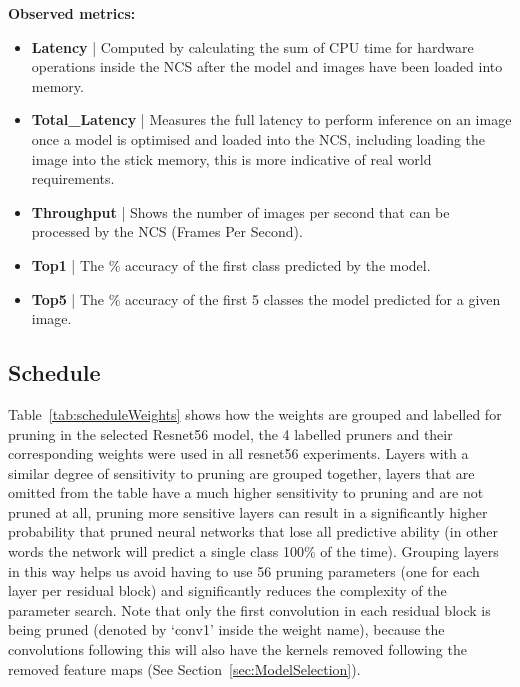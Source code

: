 \documentclass[../Dissertation.tex]{subfiles}
\begin{document}
\singlespacing
\noindent\textbf{Observed metrics:}
\begin{itemize}
    \item \textbf{Latency} | Computed by calculating the sum of CPU time for hardware operations inside the NCS after the model and images have been loaded into memory.
    \item \textbf{Total\_Latency} | Measures the full latency to perform inference on an image once a model is optimised and loaded into the NCS, including loading the image into the stick memory, this is more indicative of real world requirements.
    \item \textbf{Throughput} | Shows the number of images per second that can be processed by the NCS (Frames Per Second).
    \item \textbf{Top1} | The \% accuracy of the first class predicted by the model.
    \item \textbf{Top5} | The \% accuracy of the first 5 classes the model predicted for a given image.
\end{itemize}
\doublespacing

\newpage
\subsection{Schedule}
Table~\ref{tab:scheduleWeights} shows how the weights are grouped and labelled for pruning in the selected Resnet56 model, the 4 labelled pruners and their corresponding weights were used in all resnet56 experiments.
Layers with a similar degree of sensitivity to pruning are grouped together, layers that are omitted from the table have a much higher sensitivity to pruning and are not pruned at all, pruning more sensitive layers can result in a significantly higher probability that pruned neural networks that lose all predictive ability (in other words the network will predict a single class 100\% of the time).
Grouping layers in this way helps us avoid having to use 56 pruning parameters (one for each layer per residual block) and significantly reduces the complexity of the parameter search.
Note that only the first convolution in each residual block is being pruned (denoted by `conv1' inside the weight name), because the convolutions following this will also have the kernels removed following the removed feature maps (See Section~\ref{sec:ModelSelection}).
\end{document}
